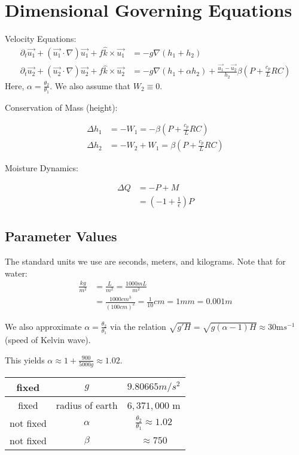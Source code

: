 \documentclass[10pt]{article}
\begin{document}
\section{Dimensional Governing Equations}
Velocity Equations:
\begin{align}
\partial_t \vec{u_1} + (\vec{u_1}\cdot \nabla )\vec{u_1} +  f\hat{k} \times \vec{u_1} &= -g \nabla (h_1 + h_2)	\\
\partial_t \vec{u_2} + (\vec{u_2}\cdot \nabla )\vec{u_2} +  f\hat{k} \times \vec{u_2} &= -g \nabla (h_1 + \alpha h_2)	 + \frac{\vec{u_1}-\vec{u_2}}{h_2}\beta \left(P + \frac{c_p}{L}RC \right)
\label{DVel}
\end{align}
Here, $\alpha = \frac{\theta_2}{\theta_1}$. 
We also assume that $W_2 \equiv 0$.

Conservation of Mass (height):

\begin{align}
\Delta h_1 &= -W_1 = -\beta \left(P + \frac{c_p}{L}RC\right)\\
\Delta h_2 &= -W_2 + W_1 = \beta \left(P + \frac{c_p}{L}RC\right)
\label{DHei}
\end{align}

Moisture Dynamics:

\begin{align}
\Delta Q &= -P + M\\
&= \left(-1 + \frac{1}{\epsilon} \right)P
\label{DMoi}
\end{align}

\subsection{Parameter Values}
The standard units we use are seconds, meters, and kilograms. Note that for water:
\begin{align*}
\frac{kg}{m^2} &= \frac{L}{m^2} = \frac{1000 mL}{m^2}\\
&= \frac{1000 cm^3}{ (100cm)^2} = \frac{1}{10} cm = 1 mm = 0.001 m 
\end{align*}

We also approximate $\alpha = \frac{\theta_2}{\theta_1}$ via the relation $\sqrt{g'H} = \sqrt{g(\alpha -1) H} \approx 30 $m$s^{-1}$ (speed of Kelvin wave).

This yields $\alpha \approx 1+\frac{900}{5000g} \approx 1.02$.


\begin{center}
	\begin{tabular}{||c |c|c|| } 
		\hline
		fixed & $g$  & $9.80665 m/s^2$ \\  \hline
		fixed & radius of earth & $6,371,000$ m \\ \hline
		not fixed & $\alpha$  & $\frac{\theta_2}{\theta_1}\approx 1.02$ \\ \hline
		not fixed & $\beta$ &  $\approx 750$ \\ \hline
	\end{tabular}
\end{center}
\end{document}
